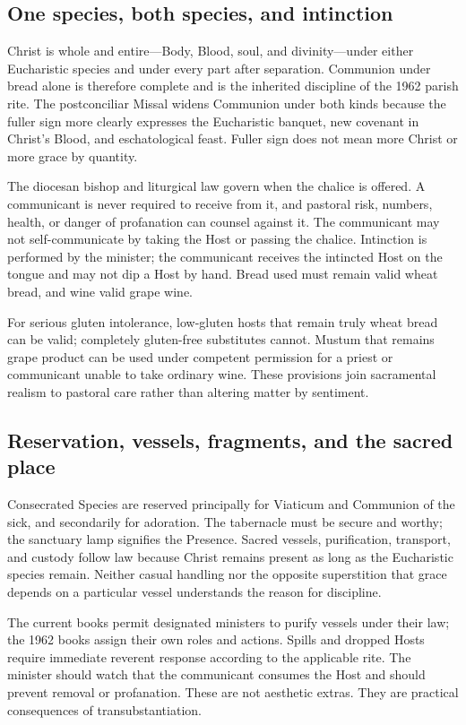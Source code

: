 \subsection{One species, both species, and intinction}

Christ is whole and entire---Body, Blood, soul, and divinity---under either Eucharistic species and under every part after separation. Communion under bread alone is therefore complete and is the inherited discipline of the 1962 parish rite. The postconciliar Missal widens Communion under both kinds because the fuller sign more clearly expresses the Eucharistic banquet, new covenant in Christ's Blood, and eschatological feast. Fuller sign does not mean more Christ or more grace by quantity.

The diocesan bishop and liturgical law govern when the chalice is offered. A communicant is never required to receive from it, and pastoral risk, numbers, health, or danger of profanation can counsel against it. The communicant may not self-communicate by taking the Host or passing the chalice. Intinction is performed by the minister; the communicant receives the intincted Host on the tongue and may not dip a Host by hand. Bread used must remain valid wheat bread, and wine valid grape wine.

For serious gluten intolerance, low-gluten hosts that remain truly wheat bread can be valid; completely gluten-free substitutes cannot. Mustum that remains grape product can be used under competent permission for a priest or communicant unable to take ordinary wine. These provisions join sacramental realism to pastoral care rather than altering matter by sentiment.

\subsection{Reservation, vessels, fragments, and the sacred place}

Consecrated Species are reserved principally for Viaticum and Communion of the sick, and secondarily for adoration. The tabernacle must be secure and worthy; the sanctuary lamp signifies the Presence. Sacred vessels, purification, transport, and custody follow law because Christ remains present as long as the Eucharistic species remain. Neither casual handling nor the opposite superstition that grace depends on a particular vessel understands the reason for discipline.

The current books permit designated ministers to purify vessels under their law; the 1962 books assign their own roles and actions. Spills and dropped Hosts require immediate reverent response according to the applicable rite. The minister should watch that the communicant consumes the Host and should prevent removal or profanation. These are not aesthetic extras. They are practical consequences of transubstantiation.


